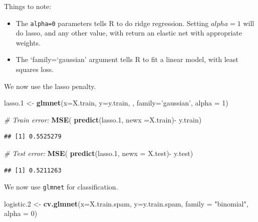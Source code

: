 \documentclass[]{book}
\newenvironment{Shaded}{\begin{snugshade}}{\end{snugshade}}
\newcommand{\KeywordTok}[1]{\textcolor[rgb]{0.13,0.29,0.53}{\textbf{{#1}}}}
\newcommand{\DataTypeTok}[1]{\textcolor[rgb]{0.13,0.29,0.53}{{#1}}}
\newcommand{\DecValTok}[1]{\textcolor[rgb]{0.00,0.00,0.81}{{#1}}}
\newcommand{\FloatTok}[1]{\textcolor[rgb]{0.00,0.00,0.81}{{#1}}}
\newcommand{\StringTok}[1]{\textcolor[rgb]{0.31,0.60,0.02}{{#1}}}
\newcommand{\CommentTok}[1]{\textcolor[rgb]{0.56,0.35,0.01}{\textit{{#1}}}}
\newcommand{\NormalTok}[1]{{#1}}
\providecommand{\tightlist}{%
  \setlength{\itemsep}{0pt}\setlength{\parskip}{0pt}}
\theoremstyle{definition}
\theoremstyle{definition}
\theoremstyle{remark}
\begin{document}
Things to note:

\begin{itemize}
\tightlist
\item
  The \texttt{alpha=0} parameters tells R to do ridge regression.
  Setting \(alpha=1\) will do lasso, and any other value, with return an
  elastic net with appropriate weights.
\item
  The `family=`gaussian' argument tells R to fit a linear model, with
  least squares loss.
\end{itemize}

We now use the lasso penalty.

\begin{Shaded}
\begin{Highlighting}[]
\NormalTok{lasso}\FloatTok{.1} \NormalTok{<-}\StringTok{ }\KeywordTok{glmnet}\NormalTok{(}\DataTypeTok{x=}\NormalTok{X.train, }\DataTypeTok{y=}\NormalTok{y.train, , }\DataTypeTok{family=}\StringTok{'gaussian'}\NormalTok{, }\DataTypeTok{alpha =} \DecValTok{1}\NormalTok{)}

\CommentTok{# Train error:}
\KeywordTok{MSE}\NormalTok{( }\KeywordTok{predict}\NormalTok{(lasso}\FloatTok{.1}\NormalTok{, }\DataTypeTok{newx =}\NormalTok{X.train)-}\StringTok{ }\NormalTok{y.train)}
\end{Highlighting}
\end{Shaded}

\begin{verbatim}
## [1] 0.5525279
\end{verbatim}

\begin{Shaded}
\begin{Highlighting}[]
\CommentTok{# Test error:}
\KeywordTok{MSE}\NormalTok{( }\KeywordTok{predict}\NormalTok{(lasso}\FloatTok{.1}\NormalTok{, }\DataTypeTok{newx =} \NormalTok{X.test)-}\StringTok{ }\NormalTok{y.test)}
\end{Highlighting}
\end{Shaded}

\begin{verbatim}
## [1] 0.5211263
\end{verbatim}

We now use \texttt{glmnet} for classification.

\begin{Shaded}
\begin{Highlighting}[]
\NormalTok{logistic}\FloatTok{.2} \NormalTok{<-}\StringTok{ }\KeywordTok{cv.glmnet}\NormalTok{(}\DataTypeTok{x=}\NormalTok{X.train.spam, }\DataTypeTok{y=}\NormalTok{y.train.spam, }\DataTypeTok{family =} \StringTok{"binomial"}\NormalTok{, }\DataTypeTok{alpha =} \DecValTok{0}\NormalTok{)}
\end{Highlighting}
\end{Shaded}
\end{document}
